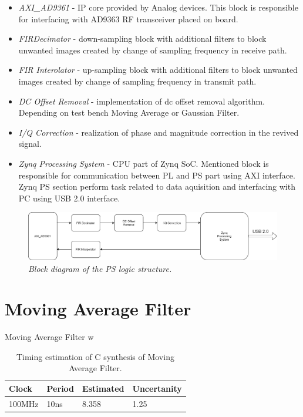 \documentclass[en,printmode]{mgr}
\begin{document}
	\begin{itemize}
		\item \textit{AXI_AD9361} - IP core provided by Analog devices. This block is responsible for
			interfacing with AD9363 RF transceiver placed on board. 
		\item \textit{FIRDecimator} - down-sampling block with additional filters to block unwanted
			images created by change of sampling frequency in receive path.
		\item \textit{FIR Interolator} - up-sampling block with additional filters to block unwanted
			images created by change of sampling frequency in transmit path.
		\item \textit{DC Offset Removal} - implementation of dc offset removal algorithm. 
			Depending on test bench Moving Average or Gaussian Filter.
		\item \textit{I/Q Correction} - realization of phase and magnitude correction in the revived
		 	signal.
		\item \textit{Zynq Processing System} - CPU part of Zynq SoC. Mentioned block is responsible for
			communication between PL and PS part using AXI interface. Zynq PS section perform task
			related to data aquisition and interfacing with PC using USB 2.0 interface.
	\end{itemize}
	
	\begin{figure}[H]
    	\centering
   		\includegraphics[width=\textheight, angle =90]{diag/hdl.png}
    	\caption{\textit{Block diagram of the PS logic structure.}}
    	\label{fig:polarplot}
	\end{figure}
	
	\section{Moving Average Filter}
		Moving Average Filter w
	\begin{table}[H]
		\centering
		\caption{}
		\begin{tabular}{|l|l|l|l|}
		\hline
		Clock  & Period & Estimated & Uncertanity \\ \hline
		100MHz & 10ns   & 8.358     & 1.25        \\ \hline
		\end{tabular}
		\caption{Timing estimation of C synthesis of Moving Average Filter.}
	\end{table}
	
\end{document}
